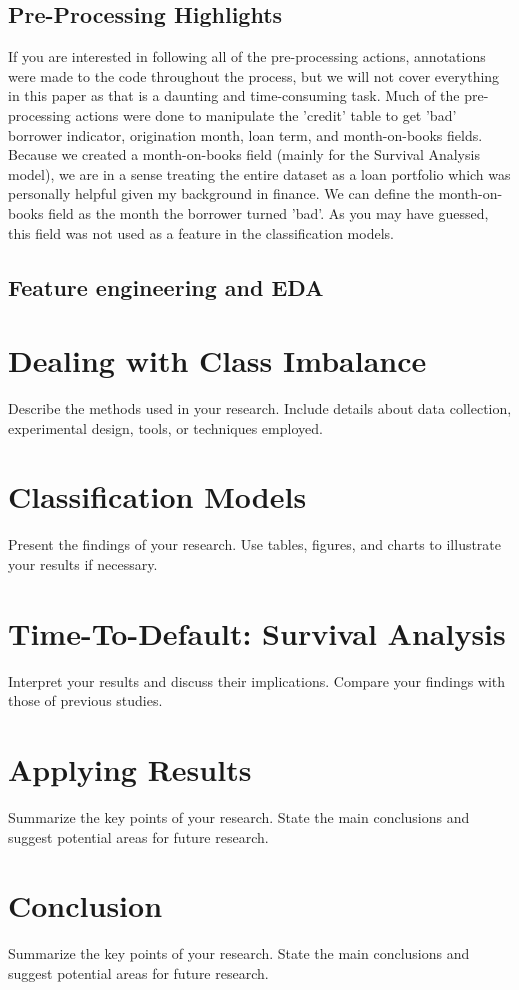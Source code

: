 \documentclass[12pt]{article}
\begin{document}
\subsection{Pre-Processing Highlights}
If you are interested in following all of the pre-processing actions, annotations were made to the code throughout the process, but we will not cover everything in this paper as that is a daunting and time-consuming task.
Much of the pre-processing actions were done to manipulate the 'credit' table to get 'bad' borrower indicator, origination month, loan term, and month-on-books fields.
Because we created a month-on-books field (mainly for the Survival Analysis model), we are in a sense treating the entire dataset as a loan portfolio which was personally helpful given my background in finance.
We can define the month-on-books field as the month the borrower turned 'bad'.
As you may have guessed, this field was not used as a feature in the classification models.
\newpage

\subsection{Feature engineering and EDA}

\section{Dealing with Class Imbalance}
Describe the methods used in your research. Include details about data collection, experimental design, tools, or techniques employed.

\section{Classification Models}
Present the findings of your research. Use tables, figures, and charts to illustrate your results if necessary.

\section{Time-To-Default: Survival Analysis}
Interpret your results and discuss their implications. Compare your findings with those of previous studies.

\section{Applying Results}
Summarize the key points of your research. State the main conclusions and suggest potential areas for future research.

\section{Conclusion}
Summarize the key points of your research. State the main conclusions and suggest potential areas for future research.

\printbibliography
\end{document}
